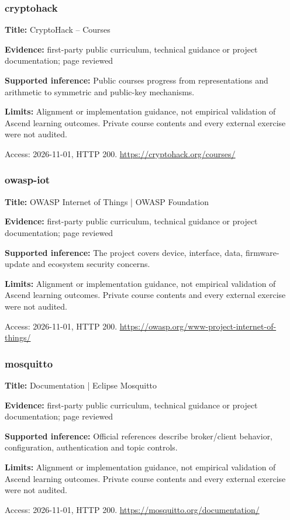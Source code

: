 \subsubsection{cryptohack}
\noindent\textbf{Title:} CryptoHack – Courses\par
\noindent\textbf{Evidence:} first-party public curriculum, technical guidance or project documentation; page reviewed\par
\noindent\textbf{Supported inference:} Public courses progress from representations and arithmetic to symmetric and public-key mechanisms.\par
\noindent\textbf{Limits:} Alignment or implementation guidance, not empirical validation of Ascend learning outcomes. Private course contents and every external exercise were not audited.\par
\noindent Access: 2026-11-01, HTTP 200. \url{https://cryptohack.org/courses/}
\subsubsection{owasp-iot}
\noindent\textbf{Title:} OWASP Internet of Things | OWASP Foundation\par
\noindent\textbf{Evidence:} first-party public curriculum, technical guidance or project documentation; page reviewed\par
\noindent\textbf{Supported inference:} The project covers device, interface, data, firmware-update and ecosystem security concerns.\par
\noindent\textbf{Limits:} Alignment or implementation guidance, not empirical validation of Ascend learning outcomes. Private course contents and every external exercise were not audited.\par
\noindent Access: 2026-11-01, HTTP 200. \url{https://owasp.org/www-project-internet-of-things/}
\subsubsection{mosquitto}
\noindent\textbf{Title:} Documentation | Eclipse Mosquitto\par
\noindent\textbf{Evidence:} first-party public curriculum, technical guidance or project documentation; page reviewed\par
\noindent\textbf{Supported inference:} Official references describe broker/client behavior, configuration, authentication and topic controls.\par
\noindent\textbf{Limits:} Alignment or implementation guidance, not empirical validation of Ascend learning outcomes. Private course contents and every external exercise were not audited.\par
\noindent Access: 2026-11-01, HTTP 200. \url{https://mosquitto.org/documentation/}
